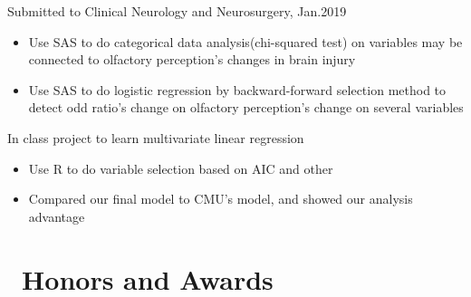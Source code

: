 \documentclass{resume}
\begin{document}
Submitted to Clinical Neurology and Neurosurgery, Jan.2019
\begin{itemize}
  \item Use SAS to do categorical data analysis(chi-squared test) on variables may be connected to olfactory perception's changes in brain injury 
  \item Use SAS to do logistic regression by backward-forward selection method to detect odd ratio's change on olfactory perception's change on several variables 
\end{itemize}

In class project to learn multivariate linear regression
\begin{itemize}
  \item Use R to do variable selection based on AIC and other  
  \item Compared our final model to CMU's model, and showed our analysis advantage
\end{itemize}


\section{\faHeartO\ Honors and Awards}


%
%
\end{document}
